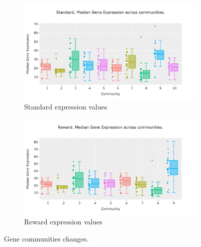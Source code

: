 \begin{figure}[H]
    \centering
    \begin{subfigure}[!t]{1.0\textwidth}
    \includegraphics[width=\textwidth,keepaspectratio]{Sections/Network_I/Resources/P0/Comms/P0_standard_4K_50TF_med.png}
        \caption{Standard expression values}
        \label{fig:N_I:p0_chg_std_exp}
    \end{subfigure}
    \begin{subfigure}[!t]{1.0\textwidth}
        \includegraphics[width=\textwidth,keepaspectratio]{Sections/Network_I/Resources/P0/Comms/P0_norm3_4K_50TF_med.png}
            \caption{Reward expression values}
            \label{fig:N_I:p0_chg_rwd_exp}
    \end{subfigure}
    \caption{Gene communities changes.}
    \label{fig:N_I:p0_comm_chgs_2}
\end{figure}



